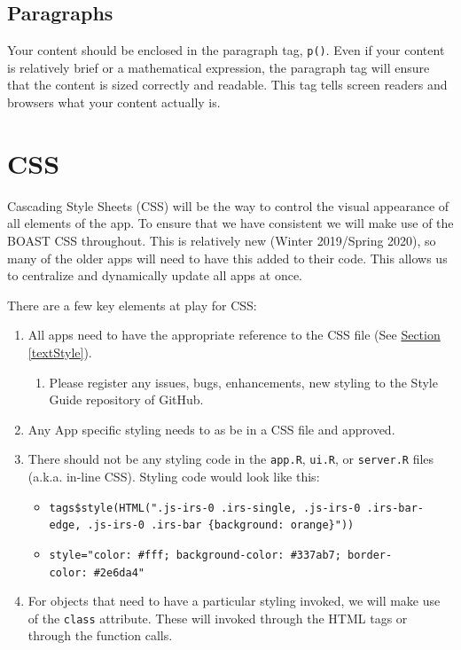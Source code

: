 \documentclass[
]{book}
\providecommand{\tightlist}{%
  \setlength{\itemsep}{0pt}\setlength{\parskip}{0pt}}
\begin{document}
\hypertarget{paragraphsb}{%
\subsection{Paragraphs}\label{paragraphsb}}

Your content should be enclosed in the paragraph tag, \texttt{p()}. Even if your content is relatively brief or a mathematical expression, the paragraph tag will ensure that the content is sized correctly and readable. This tag tells screen readers and browsers what your content actually is.

\hypertarget{cssb}{%
\section{CSS}\label{cssb}}

Cascading Style Sheets (CSS) will be the way to control the visual appearance of all elements of the app. To ensure that we have consistent we will make use of the BOAST CSS throughout. This is relatively new (Winter 2019/Spring 2020), so many of the older apps will need to have this added to their code. This allows us to centralize and dynamically update all apps at once.

There are a few key elements at play for CSS:

\begin{enumerate}
\def\labelenumi{\arabic{enumi}.}
\tightlist
\item
  All apps need to have the appropriate reference to the CSS file (See \protect\hyperlink{textStyleb}{Section \ref{textStyle}}).

  \begin{enumerate}
  \def\labelenumii{\alph{enumii}.}
  \tightlist
  \item
    Please register any issues, bugs, enhancements, new styling to the Style Guide repository of GitHub.
  \end{enumerate}
\item
  Any App specific styling needs to as be in a CSS file and approved.
\item
  There should not be any styling code in the \texttt{app.R}, \texttt{ui.R}, or \texttt{server.R} files (a.k.a. in-line CSS). Styling code would look like this:

  \begin{itemize}
  \tightlist
  \item
    \texttt{tags\$style(HTML(".js-irs-0\ .irs-single,\ .js-irs-0\ .irs-bar-edge,\ .js-irs-0\ .irs-bar\ \{background:\ orange\}"))}~\\
  \item
    \texttt{style="color:\ \#fff;\ background-color:\ \#337ab7;\ border-color:\ \#2e6da4"}
  \end{itemize}
\item
  For objects that need to have a particular styling invoked, we will make use of the \texttt{class} attribute. These will invoked through the HTML tags or through the function calls.
\end{enumerate}
\end{document}
